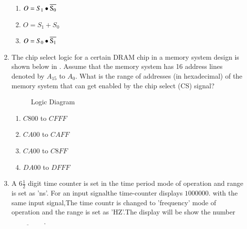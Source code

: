 \begin{enumerate}[label=\arabic*.,ref=\theenumi]
\begin{enumerate}
            \item  $O=S_1\bullet\overline{\rm S_0}$
            
            \item  $O=S_1 + S_0$
            
            \item $O=S_0\bullet\overline{\rm S _1}$
 \end{enumerate}
\item  The chip select logic for a certain DRAM chip in a memory system design is shown below
	in
.
	Assume that the memory system has 16 address lines denoted by ${A_{15}}$ to ${A_0}$. What is the range of addresses (in hexadecimal) of the memory system that can get enabled by the chip select (CS) signal?
\hfill{}

\begin{figure}[!ht]

\caption{Logic Diagram}
\label{fig:figure14}
\end{figure}

\begin{enumerate}
\item ${C800}$ to ${CFFF}$
\item ${CA00}$ to ${CAFF}$
\item ${CA00}$ to ${C8FF}$
\item ${DA00}$ to ${DFFF}$
\end{enumerate}  


\item A $6{\frac{1}{2}}$ digit time counter is set in the time period mode of operation and range is set as 'ns'. For an input signalthe time-counter displays $1000000$. with the same input signal,The time countr is changed to 'frequency' mode of operation and the range is set as 'HZ'.The display will be show the number$\underline{\hspace{2cm}}$.
\hfill{}



\end{enumerate}

